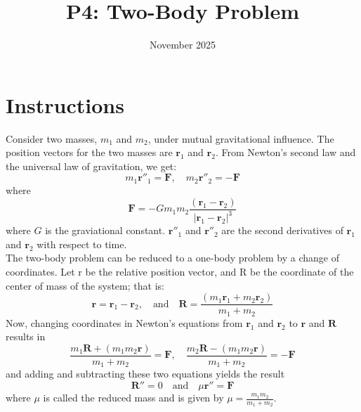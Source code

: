 \documentclass{article}
\title{P4: Two-Body Problem}
\date{November 2025}
\begin{document}
\maketitle

\section{Instructions}

Consider two masses, $m_1$ and $m_2$, under mutual gravitational influence. The position vectors for the two masses are $\mathbf{r}_1$ and $\mathbf{r}_2$. From Newton’s second law and the universal law of gravitation, we get:
\begin{equation}
    m_1\mathbf{r''}_1=\mathbf{F}, \quad m_2\mathbf{r''}_2=-\mathbf{F}
\end{equation}
\noindent where
\begin{equation}
    \mathbf{F}=-Gm_1m_2\frac{(\mathbf{r}_1-\mathbf{r}_2)}{|\mathbf{r}_1-\mathbf{r}_2|^3}
\end{equation}
where $G$ is the graviational constant. $\mathbf{r''}_1$ and $\mathbf{r''}_2$ are the second derivatives of $\mathbf{r}_1$ and $\mathbf{r}_2$ with respect to time.\\

\noindent The two-body problem can be reduced to a one-body problem by a change of coordinates. Let r be the relative position vector, and R be the coordinate of the center of mass of the system; that is:
\begin{equation}
    \mathbf{r}=\mathbf{r}_1-\mathbf{r}_2,\quad\text{and}\quad\mathbf{R}=\frac{(m_1\mathbf{r}_1+m_2\mathbf{r}_2)}{m_1+m_2}
\end{equation}
Now, changing coordinates in Newton’s equations from $\mathbf{r}_1$ and $\mathbf{r}_2$ to $\mathbf{r}$ and $\mathbf{R}$ results in
\begin{equation}
    \frac{m_1\mathbf{R}+(m_1m_2\mathbf{r})}{m_1+m_2}=\mathbf{F},\quad \frac{m_2\mathbf{R}-(m_1m_2\mathbf{r})}{m_1+m_2}=-\mathbf{F}
\end{equation}
\noindent and adding and subtracting these two equations yields the result
\begin{equation}
    \mathbf{R''}=0\quad\text{and}\quad\mu\mathbf{r''}=\mathbf{F}
\end{equation}
where $\mu$ is called the reduced mass and is given by $\mu=\frac{m_1m_2}{m_1+m_2}$.\\
\end{document}
